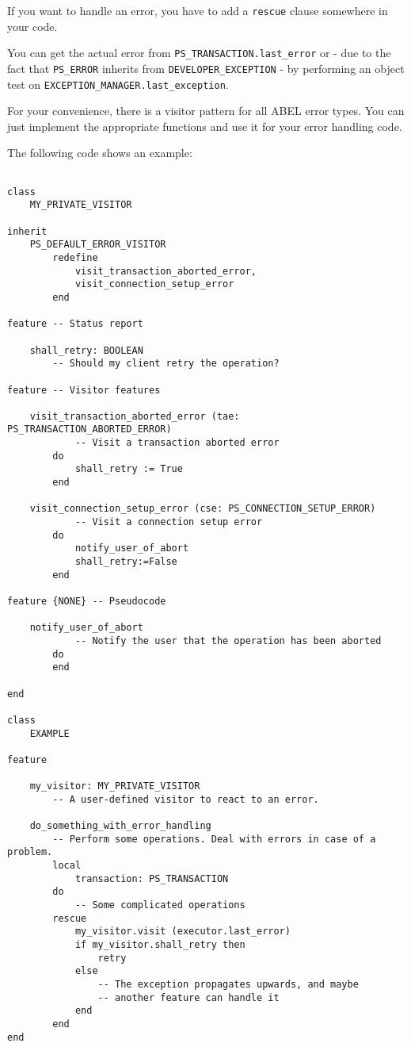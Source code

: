 \documentclass[a4paper,12pt]{report}
\begin{document}
If you want to handle an error, you have to add a \lstinline{rescue} clause somewhere in your code.

You can get the actual error from \lstinline!PS_TRANSACTION.last_error! or - due to the fact that \lstinline!PS_ERROR! inherits from \lstinline!DEVELOPER_EXCEPTION! -
by performing an object test on \lstinline!EXCEPTION_MANAGER.last_exception!.

For your convenience, there is a visitor pattern for all ABEL error types. 
You can just implement the appropriate functions and use it for your error handling code.

The following code shows an example:

\begin{lstlisting}[language=OOSC2Eiffel, captionpos=b, caption={Sample error handling using a visitor.}, label={lst:error_visitor_example}]

class
	MY_PRIVATE_VISITOR

inherit
	PS_DEFAULT_ERROR_VISITOR
		redefine
			visit_transaction_aborted_error,
			visit_connection_setup_error
		end

feature -- Status report

	shall_retry: BOOLEAN
		-- Should my client retry the operation?

feature -- Visitor features

	visit_transaction_aborted_error (tae: PS_TRANSACTION_ABORTED_ERROR)
			-- Visit a transaction aborted error
		do
			shall_retry := True
		end

	visit_connection_setup_error (cse: PS_CONNECTION_SETUP_ERROR)
			-- Visit a connection setup error
		do
			notify_user_of_abort
			shall_retry:=False
		end

feature {NONE} -- Pseudocode

	notify_user_of_abort
			-- Notify the user that the operation has been aborted
		do
		end

end

class
	EXAMPLE

feature

	my_visitor: MY_PRIVATE_VISITOR
		-- A user-defined visitor to react to an error.

	do_something_with_error_handling
		-- Perform some operations. Deal with errors in case of a problem.
		local
			transaction: PS_TRANSACTION
		do
			-- Some complicated operations
		rescue
			my_visitor.visit (executor.last_error)
			if my_visitor.shall_retry then
				retry
			else
				-- The exception propagates upwards, and maybe
				-- another feature can handle it
			end
		end
end


\end{lstlisting}
\end{document}
